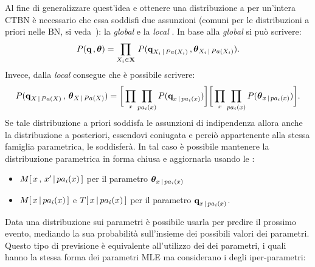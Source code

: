 Al fine di generalizzare quest'idea e ottenere una distribuzione a  per un'intera \acs{CTBN} è necessario che essa soddisfi due assunzioni (comuni per le distribuzioni a priori nelle \acl{BN}, si veda~\citet{Heckerman1996}): la \emph{global } e la \emph{local }. In base alla \emph{global } si può scrivere:
\begin{equation}\label{eq:ctbn-bayesian-params-globalind}
P(\boldsymbol{\textbf{\text{q}}}\,,\boldsymbol{\textbf{\text{$\theta$}}})=\prod_{\mathnormal{X}_i\in\mathbf{X}}\,P(\boldsymbol{\textbf{\text{q}}}_{\mathnormal{X}_i\,\arrowvert\,Pa(\mathnormal{X}_i)}\,,\boldsymbol{\textbf{\text{$\theta$}}}_{\mathnormal{X}_i\,\arrowvert\,Pa(\mathnormal{X}_i)})\text{.}
\end{equation}
Invece, dalla \emph{local } consegue che è possibile scrivere:
\footnotesize
\begin{equation}\label{eq:ctbn-bayesian-params-localind}
P(\boldsymbol{\textbf{\text{q}}}_{\mathnormal{X}\,\arrowvert\,Pa(\mathnormal{X})}\,,\,\boldsymbol{\textbf{\text{$\theta$}}}_{\mathnormal{X}\,\arrowvert\,Pa(\mathnormal{X})}) = \bigg[ \prod_{\mathnormal{x}}\prod_{pa_i(\mathnormal{x})} P(\boldsymbol{\textbf{\text{q}}}_{\mathnormal{x}\,\arrowvert\,pa_i(\mathnormal{x})}) \bigg] \bigg[ \prod_{\mathnormal{x}}\prod_{pa_i(\mathnormal{x})} P(\boldsymbol{\textbf{\text{$\theta$}}}_{\mathnormal{x}\,\arrowvert\,pa_i(\mathnormal{x})}) \bigg]\text{\normalsize .}
\end{equation}\normalsize
Se tale distribuzione a priori soddisfa le assunzioni di indipendenza allora anche la distribuzione a posteriori, essendovi coniugata e perciò appartenente alla stessa famiglia parametrica, le soddisferà. In tal caso è possibile mantenere la distribuzione parametrica in forma chiusa e aggiornarla usando le \emph{\keyword{\stats{}}}:
\begin{itemize}
\item $\mstat[x]{\setel{x}^{\prime}\,\arrowvert\,pa_i(\setel{x})}$ per il parametro $\boldsymbol{\textbf{\text{$\theta$}}}_{\mathnormal{x}\,\arrowvert\,pa_i(\mathnormal{x})}$
\item $\mstat{x\,\arrowvert\,pa_i(\setel{x})}$ e $T[\,\mathnormal{x\,\arrowvert\,pa_i(\mathnormal{x})}\,]$ per il parametro $\boldsymbol{\textbf{\text{q}}}_{\mathnormal{x}\,\arrowvert\,pa_i(\mathnormal{x})}$.
\end{itemize}
Data una distribuzione sui parametri è possibile usarla per predire il prossimo evento, mediando la sua probabilità sull'insieme dei possibili valori dei parametri. Questo tipo di previsione è equivalente all'utilizzo dei \emph{} dei parametri, i quali hanno la stessa forma dei parametri \acl{MLE} ma considerano i \emph{} degli iper-parametri:
